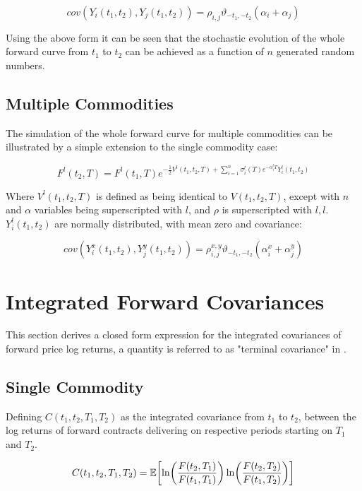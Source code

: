 \documentclass{article}
\begin{document}
\begin{equation}
    cov(Y_i(t_1, t_2), Y_j(t_1, t_2)) = \rho_{i, j} \vartheta_{-t_1, -t_2}(\alpha_i + \alpha_j)
\end{equation}

Using the above form it can be seen that the stochastic evolution of the whole forward curve
from $t_1$ to $t_2$ can be achieved as a function of $n$ generated random numbers.

\subsection{Multiple Commodities}
The simulation of the whole forward curve for multiple commodities can be illustrated
by a simple extension to the single commodity case:

\begin{equation}
    F^l(t_2, T) = F^l(t_1, T)e^{- \frac{1}{2} V^l(t_1, t_2, T) + 
        \sum_{i=1}^n \sigma_i^l(T) e^{-\alpha_i^l T} Y_i^l(t_1, t_2) }
\end{equation}

Where $V^l(t_1, t_2, T)$ is defined as being identical to $V(t_1, t_2, T)$, except with
$n$ and $\alpha$ variables being superscripted with $l$, and $\rho$ is superscripted
with $l, l$. 
$Y_i^l(t_1, t_2)$ are normally distributed, with mean zero and covariance:

\begin{equation}
    cov(Y_i^x(t_1, t_2), Y_j^y(t_1, t_2)) = \rho_{i, j}^{x, y} 
    \vartheta_{-t_1, -t_2}(\alpha_i^x + \alpha_j^y)
\end{equation}


\section{Integrated Forward Covariances}
\label{appendix:fwd_covar}
This section derives a closed form expression for the integrated covariances of
forward price log returns, a quantity is referred to as "terminal covariance" in
\cite{Rebonato}.

\subsection{Single Commodity}
Defining $C(t_1, t_2, T_1, T_2)$
as the integrated covariance from $t_1$ to $t_2$, between the log returns of forward 
contracts delivering on respective periods starting on $T_1$ and $T_2$.

\begin{equation}
    C(t_1, t_2, T_1, T_2) = \mathbb{E}\biggl[\ln\biggl(\frac{F(t_2, T_1)}{F(t_1, T_1)} \biggr) 
    \ln\biggl(\frac{F(t_2, T_2)}{F(t_1, T_2)} \biggr) \biggr] \\
\end{equation}
\end{document}
